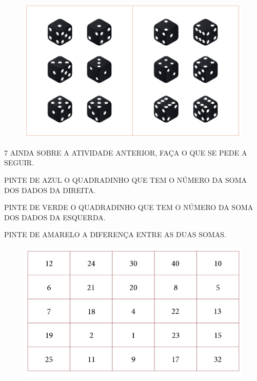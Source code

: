 
\begin{figure}[htpb!]
\centering
\includegraphics[width=.6\textwidth]{../ilustracoes/MAT1/SAEB_1ANO_MAT_FIGURA6.png}
\end{figure}


\num{7} AINDA SOBRE A ATIVIDADE ANTERIOR, FAÇA O QUE SE PEDE A SEGUIR.

\begin{escolha}
\item PINTE DE AZUL O QUADRADINHO QUE TEM O NÚMERO DA SOMA DOS DADOS DA DIREITA.

\item PINTE DE VERDE O QUADRADINHO QUE TEM O NÚMERO DA SOMA DOS DADOS DA ESQUERDA.

\item PINTE DE AMARELO A DIFERENÇA ENTRE AS DUAS SOMAS.
\end{escolha}

\begin{figure}[htpb!]
\centering
\includegraphics[width=.7\textwidth]{../ilustracoes/MAT1/SAEB_1ANO_MAT_FIGURA7.png}
\end{figure}


